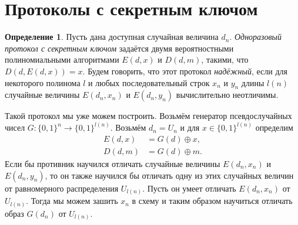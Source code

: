 \documentclass[12pt,a4paper]{article}
\newcommand{\bits}{\{0,1\}}
\theoremstyle{definition}
\newtheorem{definition}{Определение}[section]
\theoremstyle{plain}
\theoremstyle{remark}
\begin{document}
\section{Протоколы с секретным ключом}
\begin{definition}
Пусть дана доступная случайная величина $d_n$. \emph{Одноразовый протокол с секретным ключом} задаётся двумя вероятностными полиномиальными алгоритмами
$E(d,x)$ и $D(d, m)$, такими, что $D(d, E(d, x)) = x$.
Будем говорить, что этот протокол \emph{надёжный}, если для некоторого полинома $l$ и любых последовательный строк $x_n$ и $y_n$ длины $l(n)$ случайные величины $E(d_n, x_n)$ и $E(d_n, y_n)$ вычислительно неотличимы.
\end{definition}

Такой протокол мы уже можем построить. Возьмём генератор псевдослучайных чисел $G: \bits^n\to\bits^{l(n)}$.
Возьмём $d_n = U_n$ и для $x\in\bits^{l(n)}$ определим 
$$
\begin{aligned}
E(d, x) &= G(d) \oplus x,\\ D(d, m) &= G(d) \oplus m.
\end{aligned}
$$
Если бы противник научился отличать случайные величины $E(d_n, x_n)$ и $E(d_n, y_n)$, то 
он также научился бы отличать одну из этих случайных величин от равномерного распределения
$U_{l(n)}$. Пусть он умеет отличать $E(d_n, x_n)$ от $U_{l(n)}$. Тогда мы можем зашить $x_n$ в схему 
и таким образом научиться отличать образ $G(d_n)$ от $U_{l(n)}$.
\end{document}
